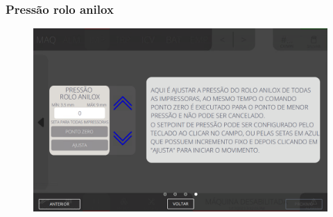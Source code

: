 \newpage
\thispagestyle{fancy}
\vspace*{40 pt}
\subsubsection{\small{Pressão rolo anilox}} \label{sec:segundaTelaGeralAjustesImpressorasPressaoRoloAnilox}
\vspace*{\fill}
\begin{figure}[h]
    \centering
    \includegraphics[width=576 px,height=360 px]{src/imagesICV/04-printters/01-printters/settings/13.png}
\end{figure}
\vspace*{\fill}